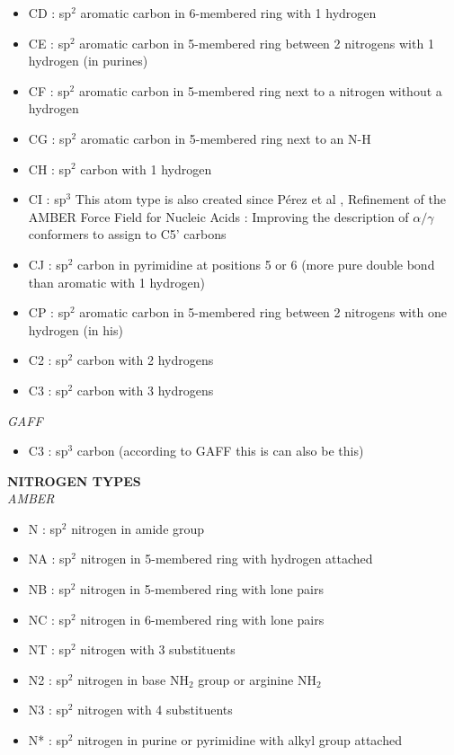 \documentclass[a4paper]{article}
\begin{document}
\begin{itemize}
    \item CD : sp$^2$ aromatic carbon in 6-membered ring with 1 hydrogen 
    \item CE : sp$^2$ aromatic carbon in 5-membered ring between 2 nitrogens with 1 hydrogen (in purines) 
    \item CF : sp$^2$ aromatic carbon in 5-membered ring next to a nitrogen without a hydrogen 
    \item CG : sp$^2$ aromatic carbon in 5-membered ring next to an N-H 
    \item CH : sp$^2$ carbon with 1 hydrogen 
    \item CI : sp$^3$ This atom type is also created since Pérez et al , Refinement of the AMBER Force Field for Nucleic Acids : Improving the description of $\alpha / \gamma$  conformers to assign to C5' carbons
    \item CJ : sp$^2$ carbon in pyrimidine at positions 5 or 6 (more pure double bond than aromatic with 1 hydrogen) 
    \item CP : sp$^2$ aromatic carbon in 5-membered ring between 2 nitrogens with one hydrogen (in his) 
    \item C2 : sp$^2$ carbon with 2 hydrogens 
    \item C3 : sp$^2$ carbon with 3 hydrogens 
\end{itemize}
\hspace{3mm}\textit{\small GAFF}
\begin{itemize}
    \item C3 : sp$^3$ carbon (according to GAFF this is can also be this)
\end{itemize}
\vspace{3mm}
%
%
%
\textbf{\normalsize NITROGEN TYPES}\\
\hspace{3mm}\textit{\small AMBER}
\begin{itemize}
    \item N : sp$^2$ nitrogen in amide group 
    \item NA : sp$^2$ nitrogen in 5-membered ring with hydrogen attached 
    \item NB : sp$^2$ nitrogen in 5-membered ring with lone pairs 
    \item NC : sp$^2$ nitrogen in 6-membered ring with lone pairs 
    \item NT : sp$^2$ nitrogen with 3 substituents 
    \item N2 : sp$^2$ nitrogen in base NH$_2$ group or arginine NH$_2$
    \item N3 : sp$^2$ nitrogen with 4 substituents 
    \item N* :  sp$^2$ nitrogen in purine or pyrimidine with alkyl group attached 
\end{itemize}
\end{document}
